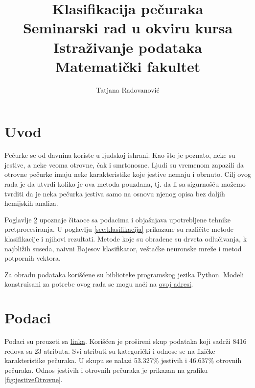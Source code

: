 \documentclass[a4paper]{article}
\begin{document}
\title{Klasifikacija pe\v curaka\\ \small{Seminarski rad u okviru kursa\\Istraživanje podataka\\ Matematički fakultet}}

\author{Tatjana Radovanović\\}


\maketitle


\tableofcontents

\newpage

\section{Uvod}
\label{sec:uvod}
Pečurke se od davnina koriste u ljudskoj ishrani. Kao što je poznato, neke su jestive, a neke veoma otrovne, čak i smrtonosne. Ljudi su vremenom zapazili da otrovne pečurke imaju neke karakteristike koje jestive nemaju i obrnuto. Cilj ovog rada je da utvrdi koliko je ova metoda pouzdana, tj. da li sa sigurnošću možemo tvrditi da je neka pečurka jestiva samo na osnovu njenog opisa bez daljih hemijskih analiza.

Poglavlje \ref{sec:podaci} upoznaje čitaoce sa podacima i objašnjava upotrebljene tehnike pretprocesiranja. U poglavlju \ref{sec:klasifikacija} prikazane su različite metode klasifikacije i njihovi rezultati. Metode koje su obrađene su drveta odlučivanja, k najbližih suseda, naivni Bajesov klasifikator, veštačke neuronske mreže i metod potpornih vektora.

Za obradu podataka korišćene su biblioteke programskog jezika Python. Modeli konstruisani za potrebe ovog rada se mogu naći na \href{https://github.com/Tatjana95/IP-Mushrooms}{ovoj adresi}.


\section{Podaci}
\label{sec:podaci}

Podaci su preuzeti sa \href{https://archive.ics.uci.edu/ml/datasets/Mushroom}{linka}. Korišćen je prošireni skup podataka koji sadrži 8416 redova sa 23 atributa.  Svi atributi su kategorički i odnose se na fizičke karakteristike pečuraka. U skupu se nalazi 53.327\% jestivih i 46.637\% otrovnih pečuraka. Odnos jestivih i otrovnih pečuraka je prikazan na grafiku \ref{fig:jestiveOtrovne}.
\end{document}
